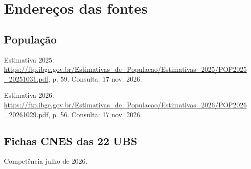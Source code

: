 \section{Endereços das fontes}
\subsection{População}
Estimativa 2025: \url{https://ftp.ibge.gov.br/Estimativas_de_Populacao/Estimativas_2025/POP2025_20251031.pdf}, p. 59. Consulta: 17 nov. 2026.\par
Estimativa 2026: \url{https://ftp.ibge.gov.br/Estimativas_de_Populacao/Estimativas_2026/POP2026_20261029.pdf}, p. 56. Consulta: 17 nov. 2026.\par

\subsection{Fichas CNES das 22 UBS}
Competência julho de 2026.
